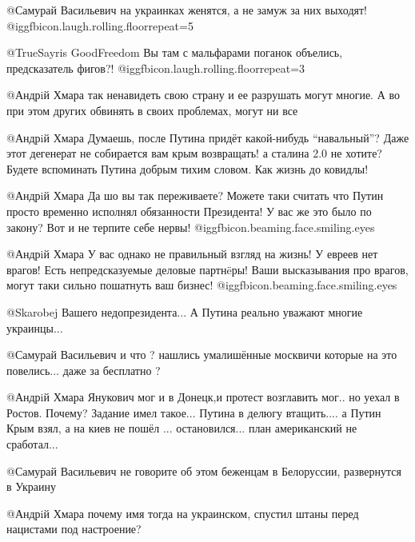 \begin{itemize}
\begin{itemize}
@Самурай Васильевич  на украинках женятся, а не замуж за них выходят!
@igg{fbicon.laugh.rolling.floor}{repeat=5} 


@TrueSayris GoodFreedom  Вы там с мальфарами поганок объелись, предсказатель
фигов?!  @igg{fbicon.laugh.rolling.floor}{repeat=3} 


@Андрiй Хмара  так ненавидеть свою страну и ее разрушать могут  многие. А во
при этом других обвинять в своих проблемах, могут ни все


@Андрiй Хмара  Думаешь, после  Путина придёт какой-нибудь \enquote{навальный}? Даже
этот дегенерат не собирается вам крым возвращать! а сталина 2.0 не хотите?
Будете вспоминать Путина добрым тихим словом. Как жизнь до ковидлы!


@Андрiй Хмара  Да шо вы так переживаете? Можете таки считать что Путин просто
временно исполнял обязанности Президента! У вас же это было по закону? Вот и
не терпите себе нервы!  @igg{fbicon.beaming.face.smiling.eyes} 


@Андрiй Хмара  У вас однако не правильный взгляд на жизнь! У евреев нет
врагов! Есть непредсказуемые деловые партнëры! Ваши высказывания про врагов,
могут таки сильно пошатнуть ваш бизнес!  @igg{fbicon.beaming.face.smiling.eyes} 


@Skarobej  Вашего недопрезидента... А Путина реально уважают многие украинцы...


@Самурай Васильевич  и что ? нашлись умалишённые москвичи которые на это
повелись... даже за бесплатно ?


@Андрiй Хмара  Янукович мог и в Донецк,и протест возглавить мог.. но уехал в
Ростов. Почему? Задание имел такое... Путина в делюгу втащить.... а Путин Крым
взял, а на киев не пошёл ... остановился... план американский не сработал...


@Самурай Васильевич  не говорите об этом беженцам в Белоруссии, развернутся в
Украину


@Андрiй Хмара  почему имя тогда на украинском, спустил штаны перед нацистами
под настроение?


\end{itemize}
\end{itemize}
